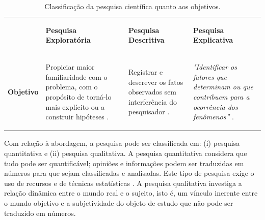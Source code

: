 \begin{table}[h]
 \centering
 \caption{Classificação da pesquisa científica quanto aos objetivos.}
 \label{tab:classificacao_pesquisa}
 {\renewcommand\arraystretch{0.25}
 \begin{tabular}{ l l l l }
  \hline
    \multicolumn{1}{p{1.883cm}}{\begin{center} 
\end{center}} &
    \multicolumn{1}{p{3.517cm}}{\begin{center}\textbf{Pesquisa Exploratória}
\end{center}} &
    \multicolumn{1}{p{3.600cm}}{\begin{center}\textbf{Pesquisa Descritiva}
\end{center}} &
    \multicolumn{1}{p{3.583cm}}{\begin{center}\textbf{Pesquisa Explicativa}
\end{center}}
  \\  
  \cline{1-1}\cline{2-2}\cline{3-3}\cline{4-4}  
    \multicolumn{1}{p{1.883cm}}{\begin{center}\textbf{Objetivo}
\end{center}} &
    \multicolumn{1}{p{3.517cm}}{\begin{center}Propiciar maior familiaridade com o problema, com o propósito de torná-lo mais explícito ou a construir hipóteses \cite[pág. 41]{gil2002}.
\end{center}} &
    \multicolumn{1}{p{3.600cm}}{\begin{center}Registrar e descrever os fatos observados sem interferência do pesquisador \cite[pág. 52]{prodanov2013}.
\end{center}} &
    \multicolumn{1}{p{3.583cm}}{\begin{center}\textit{"Identificar os fatores que determinam ou que contribuem para a ocorrência dos fenômenos”} \cite[pág. 42]{gil2002}.
\end{center}}
  \\  
  \hline

 \end{tabular} }
\end{table}

Com relação à abordagem, a pesquisa pode ser classificada em: (i) pesquisa quantitativa e (ii) pesquisa qualitativa. A pesquisa quantitativa considera que tudo pode ser quantificável; opiniões e informações podem ser traduzidas em números para que sejam classificadas e analisadas. Este tipo de pesquisa exige o uso de recursos e de técnicas estatísticas \cite{prodanov2013}. A pesquisa qualitativa investiga a relação dinâmica entre o mundo real e o sujeito, isto é, um vínculo inerente entre o mundo objetivo e a subjetividade do objeto de estudo que não pode ser traduzido em números. 

